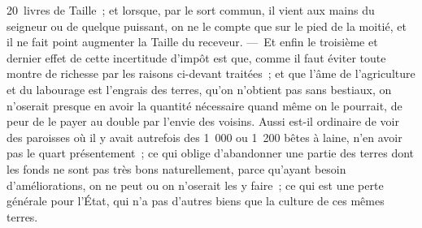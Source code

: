 \documentclass[french,twoside]{book} %
\begin{document}
20 livres de Taille ; et lorsque, par le sort commun, il vient aux mains du seigneur ou de quelque puissant, on ne le compte que sur le pied de la moitié, et il ne fait point augmenter la Taille du receveur. — Et enfin le troisième et dernier effet de cette incertitude d’impôt est que, comme il faut éviter toute montre de richesse par les raisons ci-devant traitées ; et que l’âme de l’agriculture et du labourage est l’engrais des terres, qu’on n’obtient pas sans bestiaux, on n’oserait presque en avoir la quantité nécessaire quand même on le pourrait, de peur de le payer au double par l’envie des voisins. Aussi est-il ordinaire de voir des paroisses où il y avait autrefois des 1 000 ou 1 200 bêtes à laine, n’en avoir pas le quart présentement ; ce qui oblige d’abandonner une partie des terres dont les fonds ne sont pas très bons naturellement, parce qu’ayant besoin d’améliorations, on ne peut ou on n’oserait les y faire ; ce qui est une perte générale pour l’État, qui n’a pas d’autres biens que la culture de ces mêmes terres.
\end{document}
